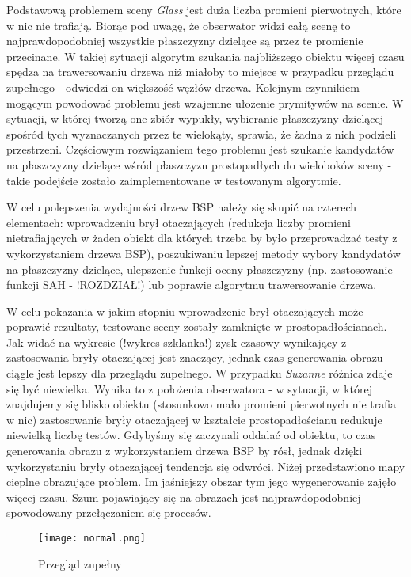 Podstawową problemem sceny \emph{Glass} jest duża liczba promieni pierwotnych, które w nic nie trafiają. Biorąc pod uwagę, że obserwator widzi całą scenę to najprawdopodobniej wszystkie płaszczyzny dzielące są przez te promienie przecinane. W takiej sytuacji algorytm szukania najbliższego obiektu więcej czasu spędza na trawersowaniu drzewa niż miałoby to miejsce w przypadku przeglądu zupełnego - odwiedzi on większość węzłów drzewa. Kolejnym czynnikiem mogącym powodować problemu jest wzajemne ułożenie prymitywów na scenie. W sytuacji, w której tworzą one zbiór wypukły, wybieranie płaszczyzny dzielącej spośród tych wyznaczanych przez te wielokąty, sprawia, że żadna z nich podzieli przestrzeni. Częściowym rozwiązaniem tego problemu jest szukanie kandydatów na płaszczyzny dzielące wśród płaszczyzn prostopadłych do wieloboków sceny - takie podejście zostało zaimplementowane w testowanym algorytmie.

W celu polepszenia wydajności drzew BSP należy się skupić na czterech elementach: wprowadzeniu brył otaczających (redukcja liczby promieni nietrafiających w żaden obiekt dla których trzeba by było przeprowadzać testy z wykorzystaniem drzewa BSP), poszukiwaniu lepszej metody wybory kandydatów na płaszczyzny dzielące, ulepszenie funkcji oceny płaszczyzny (np. zastosowanie funkcji SAH - !ROZDZIAŁ!) lub poprawie algorytmu trawersowanie drzewa.

W celu pokazania w jakim stopniu wprowadzenie brył otaczających może poprawić rezultaty, testowane sceny zostały zamknięte w prostopadłościanach. Jak widać na wykresie (!wykres szklanka!) zysk czasowy wynikający z zastosowania bryły otaczającej jest znaczący, jednak czas generowania obrazu ciągle jest lepszy dla przeglądu zupełnego. W przypadku \emph{Suzanne} różnica zdaje się być niewielka. Wynika to z położenia obserwatora - w sytuacji, w której znajdujemy się blisko obiektu (stosunkowo mało promieni pierwotnych nie trafia w nic) zastosowanie bryły otaczającej w kształcie prostopadłościanu redukuje niewielką liczbę testów. Gdybyśmy się zaczynali oddalać od obiektu, to czas generowania obrazu z wykorzystaniem drzewa BSP by rósł, jednak dzięki wykorzystaniu bryły otaczającej tendencja się odwróci. Niżej przedstawiono mapy cieplne obrazujące problem. Im jaśniejszy obszar tym jego wygenerowanie zajęło więcej czasu. Szum pojawiający się na obrazach jest najprawdopodobniej spowodowany przełączaniem się procesów.

\begin{figure}[h!]
\centering
  \caption{Przegląd zupełny}
  \texttt{[image: normal.png]}
\end{figure}

